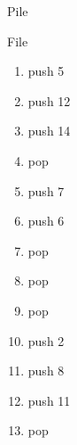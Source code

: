 \documentclass[11pt,a4paper]{article}
\begin{document}
\begin{center}

\begin{table}[ht!]
  \centering
  \begin{minipage}{0.5\textwidth}
    \centering
Pile

  \end{minipage}
  \hfillx
  \begin{minipage}{0.5\textwidth}
    \centering

File

  \end{minipage}
\end{table}



\begin{table}[ht!]
  \centering
  \begin{minipage}{0.25\textwidth}
    \centering

\begin{enumerate}[label=\roman*]
\item push 5
\item push 12
\item push 14
\item pop
\item push 7
\item push 6
\item pop
\item pop
\end{enumerate}

  \end{minipage}
  \hfillx
  \begin{minipage}{0.25\textwidth}

\begin{enumerate}[label=\roman*]
\setcounter{enumi}{8}
\item pop
\item push 2
\item push 8
\item push 11
\item pop
\end{enumerate}

\vspace*{1.75cm}

  \end{minipage}
  \hfillx
  \begin{minipage}{0.01\textwidth}



\end{minipage}
\end{table}
\end{center}
\end{document}
